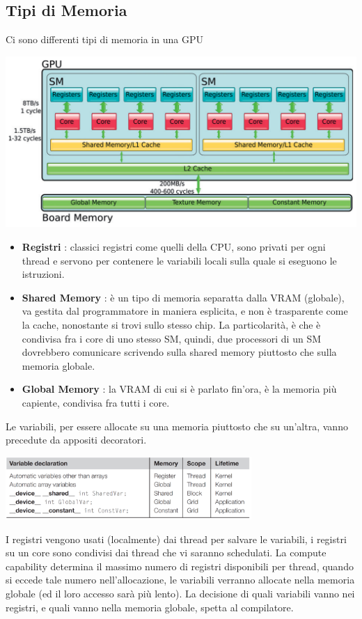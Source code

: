 \documentclass[10pt, letterpaper]{report}
\begin{document}
\subsection{Tipi di Memoria}
Ci sono differenti tipi di memoria in una GPU\begin{center}
    \includegraphics[width=\textwidth ]{images/memoryTypes.png}
\end{center}
\begin{itemize}
    \item \textbf{Registri} : classici registri come quelli della CPU, sono privati per ogni thread e servono per contenere le variabili locali sulla quale si eseguono le istruzioni. 
    \item \textbf{Shared Memory} : è un tipo di memoria separatta dalla VRAM (globale), va gestita dal programmatore in maniera esplicita, e non è trasparente come la cache, nonostante si trovi sullo stesso chip. La particolarità, è che è condivisa fra i core di uno stesso SM, quindi, due processori di un SM dovrebbero comunicare scrivendo sulla shared memory piuttosto che sulla memoria globale. 
    \item \textbf{Global Memory} : la VRAM di cui si è parlato fin'ora, è la memoria più capiente, condivisa fra tutti i core.
\end{itemize}
Le variabili, per essere allocate su una memoria piuttosto che su un'altra, vanno precedute da appositi decoratori.\begin{center}
    \includegraphics[width=0.7\textwidth ]{images/memDic.png}\end{center}
I registri vengono usati (localmente) dai thread per salvare le variabili, i registri su un core sono condivisi dai thread che vi saranno schedulati. La compute capability determina il massimo numero di registri disponibili per thread, quando si eccede tale numero nell'allocazione, le variabili verranno allocate nella memoria globale (ed il loro accesso sarà più lento). La decisione di quali variabili vanno nei registri, e quali vanno nella memoria globale, spetta al compilatore.
\end{document}
